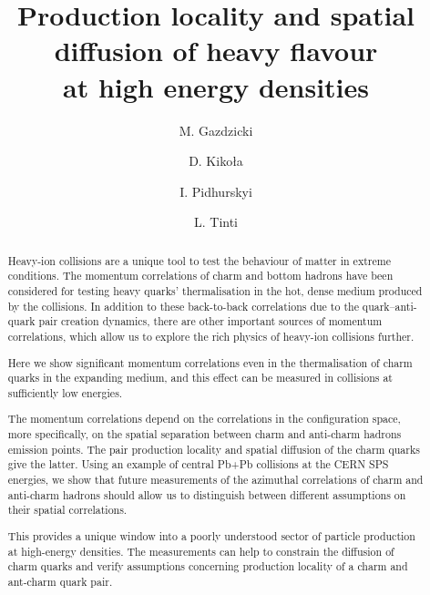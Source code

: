 \documentclass[floatfix,superscriptaddress,a4paper,
               showpieces,showkeys,nofootinbib,preprint]{revtex4-2}
\begin{document}


\title{
Production locality and spatial diffusion of heavy flavour \\
at high energy densities 
}

\author{M. Gazdzicki}
\author{D. Kiko\l{}a}
\author{I. Pidhurskyi}
\author{L. Tinti}
 
  
\begin{abstract}
Heavy-ion collisions are a unique tool to test the behaviour of matter in extreme conditions. The momentum correlations of charm and bottom hadrons have been considered for testing heavy quarks' thermalisation in the hot, dense medium produced by the collisions.
In addition to these back-to-back correlations due to the quark--anti-quark pair creation dynamics, there are other important sources of momentum correlations, which allow us to explore the rich physics of heavy-ion collisions further.

Here we show significant momentum correlations even in the thermalisation of charm quarks in the expanding medium, and this effect can be measured in collisions at sufficiently low energies.

The momentum correlations depend on the correlations in the configuration space,
more specifically, on the spatial separation between charm and anti-charm hadrons emission points.
The pair production locality and spatial diffusion of the charm quarks give the latter.
Using an example of central Pb+Pb collisions at the CERN SPS energies, we show that future measurements of the azimuthal correlations
of charm and anti-charm hadrons should allow us to distinguish between different assumptions on their spatial correlations. 

This provides a unique window into a poorly understood sector of particle production at high-energy densities. The measurements can help to constrain the diffusion of charm quarks and verify assumptions concerning production locality
of a charm and ant-charm quark pair.

\end{abstract}
\end{document}
